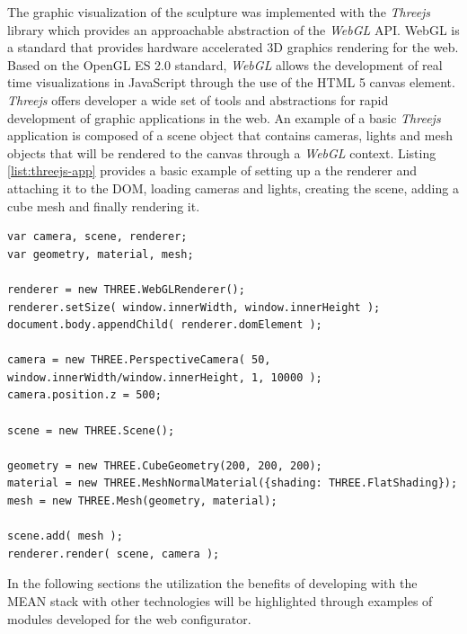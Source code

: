 \documentclass[../medieninformatik-arbeit.tex]{subfiles}
\begin{document}
The graphic visualization of the sculpture was implemented with the \textit{Threejs}\cite{cabello2010three} library which provides an approachable abstraction of the \textit{WebGL} API. WebGL is a standard that provides hardware accelerated 3D graphics rendering for the web\cite{webgl}. Based on the OpenGL ES 2.0 standard, \textit{WebGL} allows the development of real time visualizations in JavaScript through the use of the HTML 5 canvas element. \textit{Threejs} offers developer a wide set of tools and abstractions for rapid development of graphic applications in the web. An example of a basic \textit{Threejs} application is composed of a scene object that contains cameras, lights and mesh objects that will be rendered to the canvas through a \textit{WebGL} context. Listing \ref{list:threejs-app} provides a basic example of setting up a the renderer and attaching it to the DOM, loading cameras and lights, creating the scene, adding a cube mesh and finally rendering it.

\begin{lstlisting}[style=htmlcssjs, caption={Basic Threejs 3D app example},label=list:threejs-app, float=t]
var camera, scene, renderer;
var geometry, material, mesh;

renderer = new THREE.WebGLRenderer();
renderer.setSize( window.innerWidth, window.innerHeight );
document.body.appendChild( renderer.domElement );

camera = new THREE.PerspectiveCamera( 50, window.innerWidth/window.innerHeight, 1, 10000 );
camera.position.z = 500;

scene = new THREE.Scene();
					
geometry = new THREE.CubeGeometry(200, 200, 200);
material = new THREE.MeshNormalMaterial({shading: THREE.FlatShading});
mesh = new THREE.Mesh(geometry, material);

scene.add( mesh );
renderer.render( scene, camera );
\end{lstlisting}

In the following sections the utilization the benefits of developing with the MEAN stack with other technologies will be highlighted through examples of modules developed for the web configurator. 
\end{document}
